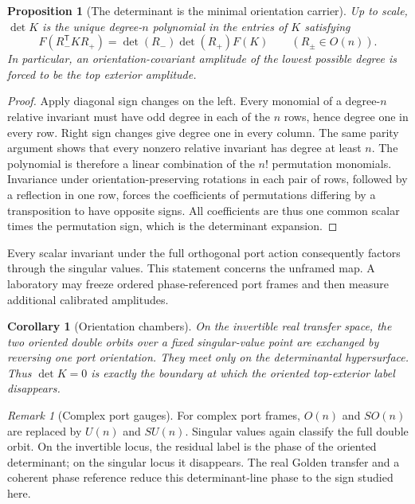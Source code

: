 \documentclass[11pt]{article}
\newtheorem{proposition}[theorem]{Proposition}
\newtheorem{corollary}[theorem]{Corollary}
\theoremstyle{remark}
\newtheorem{remark}[theorem]{Remark}
\begin{document}
\begin{proposition}[The determinant is the minimal orientation carrier]
\label{prop:unique-orientation-carrier}
Up to scale, \(\det K\) is the unique degree-\(n\) polynomial in the entries
of \(K\) satisfying
\[
 F(R_-^{\mathsf T}KR_+)
 =\det(R_-)\det(R_+)F(K)
 \qquad (R_\pm\in O(n)).
\]
In particular, an orientation-covariant amplitude of the lowest possible
degree is forced to be the top exterior amplitude.
\end{proposition}

\begin{proof}
Apply diagonal sign changes on the left.  Every monomial of a degree-\(n\)
relative invariant must have odd degree in each of the \(n\) rows, hence
degree one in every row.  Right sign changes give degree one in every column.
The same parity argument shows that every nonzero relative invariant has
degree at least \(n\).
The polynomial is therefore a linear combination of the \(n!\) permutation
monomials.  Invariance under orientation-preserving rotations in each pair of
rows, followed by a reflection in one row, forces the coefficients of
permutations differing by a transposition to have opposite signs.  All
coefficients are thus one common scalar times the permutation sign, which is
the determinant expansion.
\end{proof}

Every scalar invariant under the full orthogonal port action consequently
factors through the singular values.  This statement concerns the unframed
map.  A laboratory may freeze ordered phase-referenced port frames and then
measure additional calibrated amplitudes.

\begin{corollary}[Orientation chambers]
On the invertible real transfer space, the two oriented double orbits over a
fixed singular-value point are exchanged by reversing one port orientation.
They meet only on the determinantal hypersurface.  Thus \(\det K=0\) is
exactly the boundary at which the oriented top-exterior label disappears.
\end{corollary}

\begin{remark}[Complex port gauges]
For complex port frames, \(O(n)\) and \(SO(n)\) are replaced by \(U(n)\) and
\(SU(n)\).  Singular values again classify the full double orbit.  On the
invertible locus, the residual label is the phase of the oriented determinant;
on the singular locus it disappears.  The real Golden transfer and a coherent
phase reference reduce this determinant-line phase to the sign studied here.
\end{remark}
\end{document}
